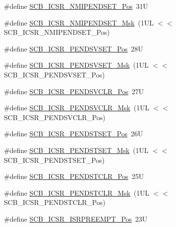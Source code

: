 \begin{DoxyCompactItemize}
\item 
\#define \hyperlink{group___c_m_s_i_s___s_c_b_ga750d4b52624a46d71356db4ea769573b}{S\+C\+B\+\_\+\+I\+C\+S\+R\+\_\+\+N\+M\+I\+P\+E\+N\+D\+S\+E\+T\+\_\+\+Pos}~31U
\item 
\#define \hyperlink{group___c_m_s_i_s___s_c_b_ga340e3f79e9c3607dee9f2c048b6b22e8}{S\+C\+B\+\_\+\+I\+C\+S\+R\+\_\+\+N\+M\+I\+P\+E\+N\+D\+S\+E\+T\+\_\+\+Msk}~(1\+U\+L $<$$<$ S\+C\+B\+\_\+\+I\+C\+S\+R\+\_\+\+N\+M\+I\+P\+E\+N\+D\+S\+E\+T\+\_\+\+Pos)
\item 
\#define \hyperlink{group___c_m_s_i_s___s_c_b_gab5ded23d2ab1d5ff7cc7ce746205e9fe}{S\+C\+B\+\_\+\+I\+C\+S\+R\+\_\+\+P\+E\+N\+D\+S\+V\+S\+E\+T\+\_\+\+Pos}~28U
\item 
\#define \hyperlink{group___c_m_s_i_s___s_c_b_ga1e40d93efb402763c8c00ddcc56724ff}{S\+C\+B\+\_\+\+I\+C\+S\+R\+\_\+\+P\+E\+N\+D\+S\+V\+S\+E\+T\+\_\+\+Msk}~(1\+U\+L $<$$<$ S\+C\+B\+\_\+\+I\+C\+S\+R\+\_\+\+P\+E\+N\+D\+S\+V\+S\+E\+T\+\_\+\+Pos)
\item 
\#define \hyperlink{group___c_m_s_i_s___s_c_b_gae218d9022288f89faf57187c4d542ecd}{S\+C\+B\+\_\+\+I\+C\+S\+R\+\_\+\+P\+E\+N\+D\+S\+V\+C\+L\+R\+\_\+\+Pos}~27U
\item 
\#define \hyperlink{group___c_m_s_i_s___s_c_b_ga4a901ace381d3c1c74ac82b22fae2e1e}{S\+C\+B\+\_\+\+I\+C\+S\+R\+\_\+\+P\+E\+N\+D\+S\+V\+C\+L\+R\+\_\+\+Msk}~(1\+U\+L $<$$<$ S\+C\+B\+\_\+\+I\+C\+S\+R\+\_\+\+P\+E\+N\+D\+S\+V\+C\+L\+R\+\_\+\+Pos)
\item 
\#define \hyperlink{group___c_m_s_i_s___s_c_b_ga9dbb3358c6167c9c3f85661b90fb2794}{S\+C\+B\+\_\+\+I\+C\+S\+R\+\_\+\+P\+E\+N\+D\+S\+T\+S\+E\+T\+\_\+\+Pos}~26U
\item 
\#define \hyperlink{group___c_m_s_i_s___s_c_b_ga7325b61ea0ec323ef2d5c893b112e546}{S\+C\+B\+\_\+\+I\+C\+S\+R\+\_\+\+P\+E\+N\+D\+S\+T\+S\+E\+T\+\_\+\+Msk}~(1\+U\+L $<$$<$ S\+C\+B\+\_\+\+I\+C\+S\+R\+\_\+\+P\+E\+N\+D\+S\+T\+S\+E\+T\+\_\+\+Pos)
\item 
\#define \hyperlink{group___c_m_s_i_s___s_c_b_gadbe25e4b333ece1341beb1a740168fdc}{S\+C\+B\+\_\+\+I\+C\+S\+R\+\_\+\+P\+E\+N\+D\+S\+T\+C\+L\+R\+\_\+\+Pos}~25U
\item 
\#define \hyperlink{group___c_m_s_i_s___s_c_b_gab241827d2a793269d8cd99b9b28c2157}{S\+C\+B\+\_\+\+I\+C\+S\+R\+\_\+\+P\+E\+N\+D\+S\+T\+C\+L\+R\+\_\+\+Msk}~(1\+U\+L $<$$<$ S\+C\+B\+\_\+\+I\+C\+S\+R\+\_\+\+P\+E\+N\+D\+S\+T\+C\+L\+R\+\_\+\+Pos)
\item 
\#define \hyperlink{group___c_m_s_i_s___s_c_b_ga11cb5b1f9ce167b81f31787a77e575df}{S\+C\+B\+\_\+\+I\+C\+S\+R\+\_\+\+I\+S\+R\+P\+R\+E\+E\+M\+P\+T\+\_\+\+Pos}~23U
$$
\end{DoxyCompactItemize}
